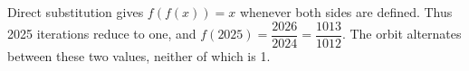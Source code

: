 Direct substitution gives $f(f(x))=x$ whenever both sides are defined. Thus 2025 iterations reduce to one, and $f(2025)=\dfrac{2026}{2024}=\boxed{\dfrac{1013}{1012}}$. The orbit alternates between these two values, neither of which is 1.
